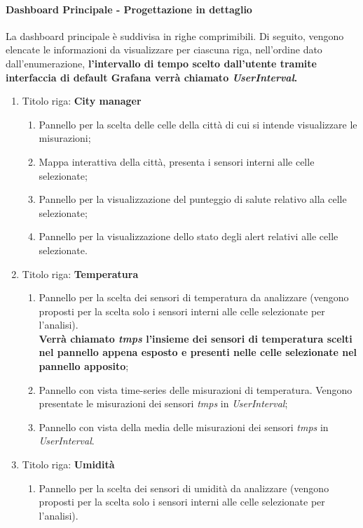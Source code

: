 \paragraph*{Dashboard Principale - Progettazione in dettaglio}
La dashboard principale è suddivisa in righe comprimibili. Di seguito, vengono elencate le informazioni da visualizzare per ciascuna riga, nell’ordine dato dall'enumerazione, \textbf{ l'intervallo di tempo scelto dall'utente tramite interfaccia di default Grafana verrà chiamato \textit{UserInterval}.}
\begin{enumerate}
    \item Titolo riga: \textbf{City manager}
    \begin{enumerate}
        \item Pannello per la scelta delle celle della città di cui si intende visualizzare le misurazioni;
        \item Mappa interattiva della città, presenta i sensori interni alle celle selezionate;
        \item Pannello per la visualizzazione del punteggio di salute relativo alla celle selezionate;
        \item Pannello per la visualizzazione dello stato degli alert relativi alle celle selezionate.
    \end{enumerate}
    \item Titolo riga: \textbf{Temperatura}
    \begin{enumerate}
        \item Pannello per la scelta dei sensori di temperatura da analizzare (vengono proposti per la scelta solo i sensori interni alle celle selezionate per l'analisi).\\
        \textbf{Verrà chiamato \textit{tmps} l'insieme dei sensori di temperatura scelti nel pannello appena esposto e presenti nelle celle selezionate nel pannello apposito};
        \item Pannello con vista time-series delle misurazioni di temperatura. Vengono presentate le misurazioni dei sensori \textit{tmps} in \textit{UserInterval};
        \item Pannello con vista della media delle misurazioni dei sensori \textit{tmps} in \textit{UserInterval}.
    \end{enumerate}
    \item Titolo riga: \textbf{Umidità}
    \begin{enumerate}
        \item Pannello per la scelta dei sensori di umidità da analizzare (vengono proposti per la scelta solo i sensori interni alle celle selezionate per l'analisi).\\

\end{enumerate}
\end{enumerate}
